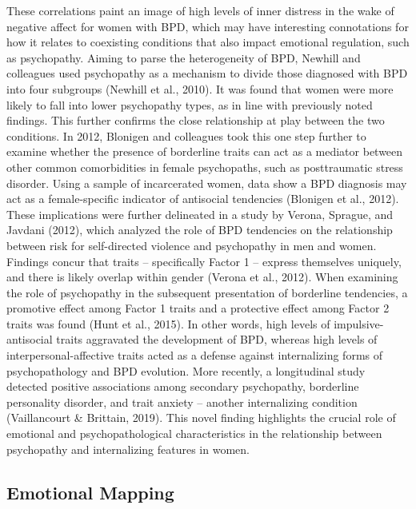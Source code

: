 \documentclass[
  man,floatsintext]{apa7}
\begin{document}
These correlations paint an image of high levels of inner distress in the wake of negative affect for women with BPD, which may have interesting connotations for how it relates to coexisting conditions that also impact emotional regulation, such as psychopathy. Aiming to parse the heterogeneity of BPD, Newhill and colleagues used psychopathy as a mechanism to divide those diagnosed with BPD into four subgroups (Newhill et al., 2010). It was found that women were more likely to fall into lower psychopathy types, as in line with previously noted findings. This further confirms the close relationship at play between the two conditions. In 2012, Blonigen and colleagues took this one step further to examine whether the presence of borderline traits can act as a mediator between other common comorbidities in female psychopaths, such as posttraumatic stress disorder. Using a sample of incarcerated women, data show a BPD diagnosis may act as a female-specific indicator of antisocial tendencies (Blonigen et al., 2012). These implications were further delineated in a study by Verona, Sprague, and Javdani (2012), which analyzed the role of BPD tendencies on the relationship between risk for self-directed violence and psychopathy in men and women. Findings concur that traits -- specifically Factor 1 -- express themselves uniquely, and there is likely overlap within gender (Verona et al., 2012). When examining the role of psychopathy in the subsequent presentation of borderline tendencies, a promotive effect among Factor 1 traits and a protective effect among Factor 2 traits was found (Hunt et al., 2015). In other words, high levels of impulsive-antisocial traits aggravated the development of BPD, whereas high levels of interpersonal-affective traits acted as a defense against internalizing forms of psychopathology and BPD evolution. More recently, a longitudinal study detected positive associations among secondary psychopathy, borderline personality disorder, and trait anxiety -- another internalizing condition (Vaillancourt \& Brittain, 2019). This novel finding highlights the crucial role of emotional and psychopathological characteristics in the relationship between psychopathy and internalizing features in women.

\hypertarget{emotional-mapping}{%
\subsection{Emotional Mapping}\label{emotional-mapping}}
\end{document}
